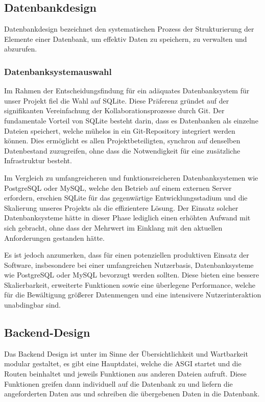 \documentclass[../main.tex]{subfiles} %
\begin{document}
\subsection{Datenbankdesign} %

Datenbankdesign bezeichnet den systematischen Prozess der Strukturierung der Elemente einer Datenbank, um effektiv Daten zu speichern, zu verwalten und abzurufen.

\subsubsection{Datenbanksystemauswahl}
Im Rahmen der Entscheidungsfindung für ein adäquates Datenbanksystem für unser Projekt fiel die Wahl auf SQLite.
Diese Präferenz gründet auf der signifikanten Vereinfachung der Kollaborationsprozesse durch Git. Der fundamentale Vorteil von SQLite besteht darin, dass es Datenbanken als einzelne Dateien speichert, welche mühelos in ein Git-Repository integriert werden können.
Dies ermöglicht es allen Projektbeteiligten, synchron auf denselben Datenbestand zuzugreifen, ohne dass die Notwendigkeit für eine zusätzliche Infrastruktur besteht.

Im Vergleich zu umfangreicheren und funktionsreicheren Datenbanksystemen wie PostgreSQL oder MySQL, welche den Betrieb auf einem externen Server erfordern, erschien SQLite für das gegenwärtige Entwicklungsstadium und die Skalierung unseres Projekts als die effizientere Lösung. Der Einsatz solcher Datenbanksysteme hätte in dieser Phase lediglich einen erhöhten Aufwand mit sich gebracht, ohne dass der Mehrwert im Einklang mit den aktuellen Anforderungen gestanden hätte.

Es ist jedoch anzumerken, dass für einen potenziellen produktiven Einsatz der Software, insbesondere bei einer umfangreichen Nutzerbasis, Datenbanksysteme wie PostgreSQL oder MySQL bevorzugt werden sollten.
Diese bieten eine bessere Skalierbarkeit, erweiterte Funktionen sowie eine überlegene Performance, welche für die Bewältigung größerer Datenmengen und eine intensivere Nutzerinteraktion unabdingbar sind.

\subsection{Backend-Design} %

Das Backend Design ist unter im Sinne der Übersichtlichkeit und Wartbarkeit modular gestaltet, es gibt eine Hauptdatei,
welche die ASGI startet und die Routen beinhaltet und jeweils Funktionen aus anderen Dateien aufruft. Diese Funktionen greifen
dann individuell auf die Datenbank zu und liefern die angeforderten Daten aus und schreiben die übergebenen Daten in die Datenbank.
\end{document}
